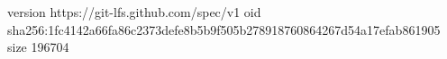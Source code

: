 version https://git-lfs.github.com/spec/v1
oid sha256:1fc4142a66fa86c2373defe8b5b9f505b278918760864267d54a17efab861905
size 196704
